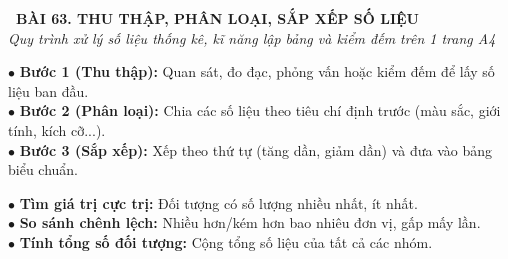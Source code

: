 \documentclass[14pt,a4paper,oneside]{extbook}
\begin{document}
\noindent
\begin{tcolorbox}[
  enhanced,
  colback=teal!8!white,
  colframe=teal!80!black,
  arc=3mm,
  boxrule=1.1pt,
  width=\linewidth,
  halign=center,
  top=2.2mm, bottom=2.2mm,
  left=3mm, right=3mm,
  drop fuzzy shadow
]
  {\large\bfseries\color{teal!95!black}\faBookmark\ BÀI 63. THU THẬP, PHÂN LOẠI, SẮP XẾP SỐ LIỆU}\\[2pt]
  {\scriptsize\color{black!75}\itshape Quy trình xử lý số liệu thống kê, kĩ năng lập bảng và kiểm đếm trên 1 trang A4}
\end{tcolorbox}

\vspace{3.2mm}
\noindent
\begin{minipage}[t]{0.56\textwidth}
  \begin{tcolorbox}[
    enhanced,
    title={\footnotesize\bfseries\color{white}\faListOl\ 1. Quy trình 3 bước xử lý số liệu},
    colback=blue!2!white,
    colframe=blue!75!black,
    arc=2.5mm, boxrule=0.8pt, top=1.8mm, bottom=1.8mm, left=2.2mm, right=2.2mm
  ]
    \footnotesize
    $\bullet$ \textbf{Bước 1 (Thu thập):} Quan sát, đo đạc, phỏng vấn hoặc kiểm đếm để lấy số liệu ban đầu.\\
    $\bullet$ \textbf{Bước 2 (Phân loại):} Chia các số liệu theo tiêu chí định trước (màu sắc, giới tính, kích cỡ...).\\
    $\bullet$ \textbf{Bước 3 (Sắp xếp):} Xếp theo thứ tự (tăng dần, giảm dần) và đưa vào bảng biểu chuẩn.
  \end{tcolorbox}
\end{minipage}%
\hfill
\begin{minipage}[t]{0.42\textwidth}
  \begin{tcolorbox}[
    enhanced,
    title={\footnotesize\bfseries\color{white}\faTable\ 2. Kĩ năng đọc bảng số liệu},
    colback=teal!2!white,
    colframe=teal!75!black,
    arc=2.5mm, boxrule=0.8pt, top=1.8mm, bottom=1.8mm, left=2mm, right=2mm
  ]
    \footnotesize
    $\bullet$ \textbf{Tìm giá trị cực trị:} Đối tượng có số lượng nhiều nhất, ít nhất.\\
    $\bullet$ \textbf{So sánh chênh lệch:} Nhiều hơn/kém hơn bao nhiêu đơn vị, gấp mấy lần.\\
    $\bullet$ \textbf{Tính tổng số đối tượng:} Cộng tổng số liệu của tất cả các nhóm.
  \end{tcolorbox}
\end{minipage}

\vspace{3mm}
\end{document}
